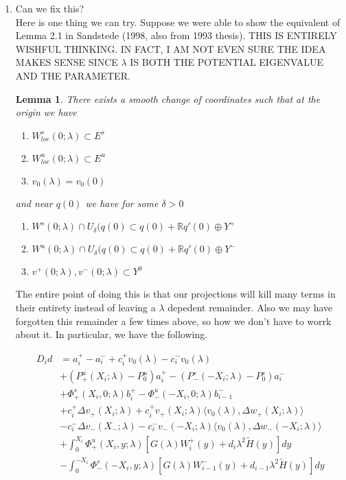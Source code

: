 \documentclass[12pt]{article}
\def\R{{\mathbb R}}
\newtheorem{lemma}{Lemma}
\begin{document}
\begin{enumerate}
\item Can we fix this?\\

Here is one thing we can try. Suppose we were able to show the equivalent of Lemma 2.1 in Sandstede (1998, also from 1993 thesis). THIS IS ENTIRELY WISHFUL THINKING. IN FACT, I AM NOT EVEN SURE THE IDEA MAKES SENSE SINCE $\lambda$ IS BOTH THE POTENTIAL EIGENVALUE AND THE PARAMETER.

\begin{lemma}There exists a smooth change of coordinates such that at the origin we have
\begin{enumerate}
	\item $W^s_{loc}(0; \lambda) \subset E^s$
	\item $W^u_{loc}(0; \lambda) \subset E^u$
	\item $v_0(\lambda) = v_0(0)$
\end{enumerate}
and near $q(0)$ we have for some $\delta > 0$
\begin{enumerate}
	\item $W^s(0; \lambda) \cap U_\delta(q(0) \subset q(0) + \R q'(0) \oplus Y^+ $
	\item $W^u(0; \lambda) \cap U_\delta(q(0) \subset q(0) + \R q'(0) \oplus Y^- $
	\item $v^+(0; \lambda), v^-(0; \lambda) \subset Y^0$
\end{enumerate}
\end{lemma}

The entire point of doing this is that our projections will kill many terms in their entirety instead of leaving a $\lambda$ depedent remainder. Also we may have forgotten this remainder a few times above, so how we don't have to worrk about it. In particular, we have the following.

\begin{align*}
D_i d &= a_i^+ - a_i^- + c_i^+ v_0(\lambda) - c_i^- v_0(\lambda) \\
&+ (P^u_+(X_i; \lambda) - P_0^u)a_i^+ - (P^s_-(-X_i; \lambda) - P_0^s)a_i^- \\
&+ \Phi^s_+(X_i, 0; \lambda)b_i^+ - \Phi^u_-(-X_i, 0; \lambda)b_{i-1}^- \\
&+ c_i^+ \Delta v_+(X_i; \lambda) + c_i^+ v_+(X_i; \lambda) \langle v_0(\lambda), \Delta w_+(X_i; \lambda) \rangle \\
&- c_i^- \Delta v_-(X_-; \lambda) - c_i^- v_-(-X_i; \lambda) \langle v_0(\lambda), \Delta w_-(-X_i; \lambda) \rangle \\
&+ \int_0^{X_i} \Phi^u_+(X_i, y; \lambda) [ G(\lambda)W_i^+(y) + d_i \lambda^2 \tilde{H}(y) ] dy \\
&- \int_0^{-X_i} \Phi^s_-(-X_i, y; \lambda) [ G(\lambda)W_{i-1}^-(y) + d_{i-1} \lambda^2 \tilde{H}(y) ] dy
\end{align*}


\end{enumerate}
\end{document}
